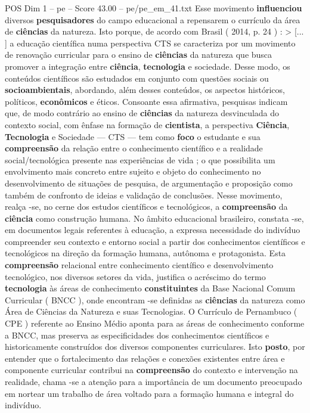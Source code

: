 \begin{textsample}{POS Dim 1 – pe – Score 43.00 – pe/pe\_em\_41.txt}
Esse movimento \textbf{influenciou} diversos \textbf{pesquisadores} do campo educacional a repensarem o currículo da área de \textbf{ciências} da natureza.
Isto porque, de acordo com Brasil ( 2014, p. 24 ) : > [... ] a educação científica numa perspectiva CTS se caracteriza por um movimento de renovação curricular para o ensino de \textbf{ciências} da natureza que busca promover a integração entre \textbf{ciência}, \textbf{tecnologia} e sociedade.
Desse modo, os conteúdos científicos são estudados em conjunto com questões sociais ou \textbf{socioambientais}, abordando, além desses conteúdos, os aspectos históricos, políticos, \textbf{econômicos} e éticos.
Consoante essa afirmativa, pesquisas indicam que, de modo contrário ao ensino de \textbf{ciências} da natureza desvinculada do contexto social, com ênfase na formação de \textbf{cientista}, a perspectiva \textbf{Ciência}, \textbf{Tecnologia} e Sociedade — CTS — tem como \textbf{foco} o estudante e sua \textbf{compreensão} da relação entre o conhecimento científico e a realidade social/tecnológica presente nas experiências de vida ; o que possibilita um envolvimento mais concreto entre sujeito e objeto do conhecimento no desenvolvimento de situações de pesquisa, de argumentação e proposição como também de confronto de ideias e validação de conclusões.
Nesse movimento, realça -se, no cerne dos estudos científicos e tecnológicos, a \textbf{compreensão} da \textbf{ciência} como construção humana.
No âmbito educacional brasileiro, constata -se, em documentos legais referentes à educação, a expressa necessidade do indivíduo compreender seu contexto e entorno social a partir dos conhecimentos científicos e tecnológicos na direção da formação humana, autônoma e protagonista.
Esta \textbf{compreensão} relacional entre conhecimento científico e desenvolvimento tecnológico, nos diversos setores da vida, justifica o acréscimo do termo \textbf{tecnologia} às áreas de conhecimento \textbf{constituintes} da Base Nacional Comum Curricular ( BNCC ), onde encontram -se definidas as \textbf{ciências} da natureza como Área de Ciências da Natureza e suas Tecnologias.
O Currículo de Pernambuco ( CPE ) referente ao Ensino Médio aponta para as áreas de conhecimento conforme a BNCC, mas preserva as especificidades dos conhecimentos científicos e historicamente construídos dos diversos componentes curriculares.
Isto \textbf{posto}, por entender que o fortalecimento das relações e conexões existentes entre área e componente curricular contribui na \textbf{compreensão} do contexto e intervenção na realidade, chama -se a atenção para a importância de um documento preocupado em nortear um trabalho de área voltado para a formação humana e integral do indivíduo.

\end{textsample}
